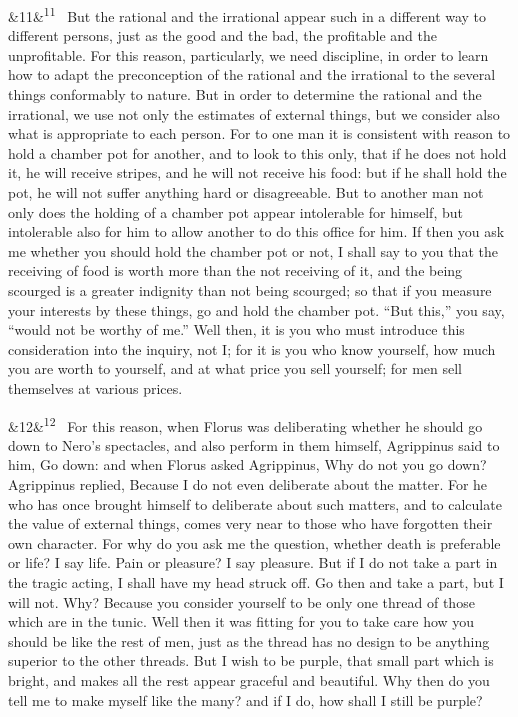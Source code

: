 \documentclass[12pt]{article}
\newcommand{\para}[1][]{\par\noindent\ifx&#1&\else\textsuperscript{\footnotesize #1}~\fi}
\begin{document}
\para[11] But the rational and the irrational appear such in a different way to different persons, just as the good and the bad, the profitable and the unprofitable. For this reason, particularly, we need discipline, in order to learn how to adapt the preconception of the rational and the irrational to the several things conformably to nature. But in order to determine the rational and the irrational, we use not only the estimates of external things, but we consider also what is appropriate to each person. For to one man it is consistent with reason to hold a chamber pot for another, and to look to this only, that if he does not hold it, he will receive stripes, and he will not receive his food: but if he shall hold the pot, he will not suffer anything hard or disagreeable. But to another man not only does the holding of a chamber pot appear intolerable for himself, but intolerable also for him to allow another to do this office for him. If then you ask me whether you should hold the chamber pot or not, I shall say to you that the receiving of food is worth more than the not receiving of it, and the being scourged is a greater indignity than not being scourged; so that if you measure your interests by these things, go and hold the chamber pot. “But this,” you say, “would not be worthy of me.” Well then, it is you who must introduce this consideration into the inquiry, not I; for it is you who know yourself, how much you are worth to yourself, and at what price you sell yourself; for men sell themselves at various prices.

\para[12] For this reason, when Florus was deliberating whether he should go down to Nero's spectacles, and also perform in them himself, Agrippinus said to him, Go down: and when Florus asked Agrippinus, Why do not you go down? Agrippinus replied, Because I do not even deliberate about the matter. For he who has once brought himself to deliberate about such matters, and to calculate the value of external things, comes very near to those who have forgotten their own character. For why do you ask me the question, whether death is preferable or life? I say life. Pain or pleasure? I say pleasure. But if I do not take a part in the tragic acting, I shall have my head struck off. Go then and take a part, but I will not. Why? Because you consider yourself to be only one thread of those which are in the tunic. Well then it was fitting for you to take care how you should be like the rest of men, just as the thread has no design to be anything superior to the other threads. But I wish to be purple, that small part which is bright, and makes all the rest appear graceful and beautiful. Why then do you tell me to make myself like the many? and if I do, how shall I still be purple?
\end{document}
